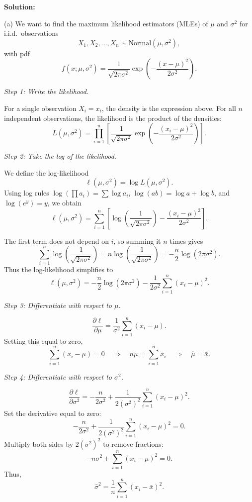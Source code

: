 \documentclass[11pt,letterpaper]{article}
\theoremstyle{remark}
\begin{document}
\vspace{1cm}

\textbf{Solution:}

(a) We want to find the maximum likelihood estimators (MLEs) of $\mu$ and $\sigma^2$ for i.i.d.\ observations
\[
X_1, X_2, \ldots, X_n \sim \mathrm{Normal}(\mu,\sigma^2),
\]
with pdf
\[
f(x;\mu,\sigma^2)
= \frac{1}{\sqrt{2\pi\sigma^2}}
  \exp\!\left(-\frac{(x-\mu)^2}{2\sigma^2}\right).
\]

\textit{Step 1: Write the likelihood.}

For a single observation $X_i = x_i$, the density is the expression above.
For all $n$ independent observations, the likelihood is the product of the densities:
\[
L(\mu,\sigma^2)
= \prod_{i=1}^n
  \left[
    \frac{1}{\sqrt{2\pi\sigma^2}}
    \exp\!\left(-\frac{(x_i-\mu)^2}{2\sigma^2}\right)
  \right].
\]

\textit{Step 2: Take the log of the likelihood.}

We define the log-likelihood
\[
\ell(\mu,\sigma^2) = \log L(\mu,\sigma^2).
\]
Using log rules $\log(\prod a_i)=\sum\log a_i$, $\log(ab)=\log a+\log b$, and $\log(e^y)=y$, we obtain
\[
\ell(\mu,\sigma^2)
= \sum_{i=1}^n
  \left[
    \log\left(\frac{1}{\sqrt{2\pi\sigma^2}}\right)
    - \frac{(x_i-\mu)^2}{2\sigma^2}
  \right].
\]

The first term does not depend on $i$, so summing it $n$ times gives
\[
\sum_{i=1}^n \log\left(\frac{1}{\sqrt{2\pi\sigma^2}}\right)
= n \log\left(\frac{1}{\sqrt{2\pi\sigma^2}}\right)
= -\frac{n}{2}\log(2\pi\sigma^2).
\]
Thus the log-likelihood simplifies to
\[
\ell(\mu,\sigma^2)
= -\frac{n}{2}\log(2\pi\sigma^2)
  - \frac{1}{2\sigma^2}\sum_{i=1}^n (x_i-\mu)^2.
\]

\textit{Step 3: Differentiate with respect to $\mu$.}

\[
\frac{\partial \ell}{\partial \mu}
= \frac{1}{\sigma^2}\sum_{i=1}^n (x_i - \mu).
\]
Setting this equal to zero,
\[
\sum_{i=1}^n (x_i - \mu) = 0
\quad\Longrightarrow\quad
n\mu = \sum_{i=1}^n x_i
\quad\Longrightarrow\quad
\hat{\mu} = \bar{x}.
\]

\textit{Step 4: Differentiate with respect to $\sigma^2$.}

\[
\frac{\partial \ell}{\partial \sigma^2}
= -\frac{n}{2\sigma^2}
  + \frac{1}{2(\sigma^2)^2}\sum_{i=1}^n (x_i - \mu)^2.
\]
Set the derivative equal to zero:
\[
-\frac{n}{2\sigma^2}
+ \frac{1}{2(\sigma^2)^2}\sum_{i=1}^n (x_i - \mu)^2 = 0.
\]
Multiply both sides by $2(\sigma^2)^2$ to remove fractions:
\[
-n\sigma^2 + \sum_{i=1}^n (x_i - \mu)^2 = 0.
\]
Thus,
\[
\hat{\sigma}^2 = \frac{1}{n} \sum_{i=1}^n (x_i - \bar{x})^2.
\]
\end{document}
